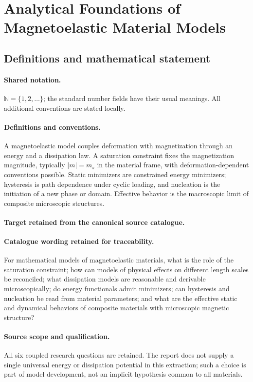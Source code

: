 \documentclass[11pt]{article}
\begin{document}
\section{Analytical Foundations of Magnetoelastic Material Models}\label{statement}

\subsection{Definitions and mathematical statement}

\paragraph{Shared notation.}$\mathbb N=\{1,2,\ldots\}$; the standard number fields have their usual meanings. All additional conventions are stated locally.


\paragraph{Definitions and conventions.}
A magnetoelastic model couples deformation with magnetization through an energy and a dissipation law. A saturation constraint fixes the magnetization magnitude, typically $|m|=m_s$ in the material frame, with deformation-dependent conventions possible. Static minimizers are constrained energy minimizers; hysteresis is path dependence under cyclic loading, and nucleation is the initiation of a new phase or domain. Effective behavior is the macroscopic limit of composite microscopic structures.

\paragraph{Target retained from the canonical source catalogue.}
\paragraph{Catalogue wording retained for traceability.}
For mathematical models of magnetoelastic materials, what is the role of the saturation constraint; how can models of physical effects on different length scales be reconciled; what dissipation models are reasonable and derivable microscopically; do energy functionals admit minimizers; can hysteresis and nucleation be read from material parameters; and what are the effective static and dynamical behaviors of composite materials with microscopic magnetic structure?

\paragraph{Source scope and qualification.}
All six coupled research questions are retained. The report does not supply a single universal energy or dissipation potential in this extraction; such a choice is part of model development, not an implicit hypothesis common to all materials.
\end{document}
